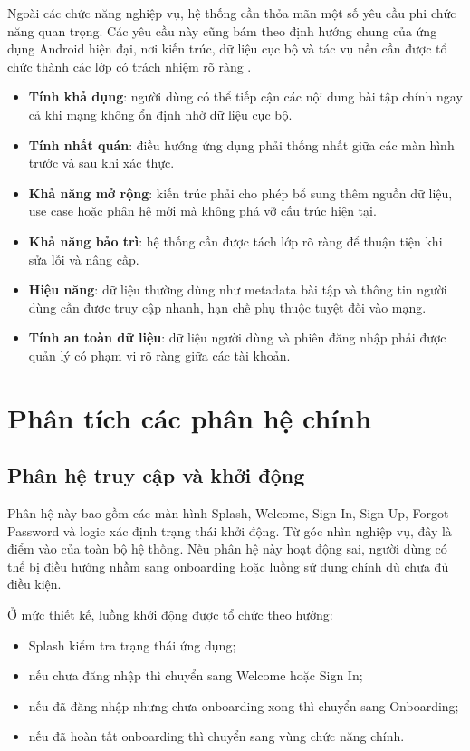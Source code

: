 Ngoài các chức năng nghiệp vụ, hệ thống cần thỏa mãn một số yêu cầu phi chức năng quan trọng. Các yêu cầu này cũng bám theo định hướng chung của ứng dụng Android hiện đại, nơi kiến trúc, dữ liệu cục bộ và tác vụ nền cần được tổ chức thành các lớp có trách nhiệm rõ ràng \cite{android_jetpack,android_room,android_workmanager}.

\begin{itemize}
    \item \textbf{Tính khả dụng}: người dùng có thể tiếp cận các nội dung bài tập chính ngay cả khi mạng không ổn định nhờ dữ liệu cục bộ.
    \item \textbf{Tính nhất quán}: điều hướng ứng dụng phải thống nhất giữa các màn hình trước và sau khi xác thực.
    \item \textbf{Khả năng mở rộng}: kiến trúc phải cho phép bổ sung thêm nguồn dữ liệu, use case hoặc phân hệ mới mà không phá vỡ cấu trúc hiện tại.
    \item \textbf{Khả năng bảo trì}: hệ thống cần được tách lớp rõ ràng để thuận tiện khi sửa lỗi và nâng cấp.
    \item \textbf{Hiệu năng}: dữ liệu thường dùng như metadata bài tập và thông tin người dùng cần được truy cập nhanh, hạn chế phụ thuộc tuyệt đối vào mạng.
    \item \textbf{Tính an toàn dữ liệu}: dữ liệu người dùng và phiên đăng nhập phải được quản lý có phạm vi rõ ràng giữa các tài khoản.
\end{itemize}

\section{Phân tích các phân hệ chính}

\subsection{Phân hệ truy cập và khởi động}

Phân hệ này bao gồm các màn hình Splash, Welcome, Sign In, Sign Up, Forgot Password và logic xác định trạng thái khởi động. Từ góc nhìn nghiệp vụ, đây là điểm vào của toàn bộ hệ thống. Nếu phân hệ này hoạt động sai, người dùng có thể bị điều hướng nhầm sang onboarding hoặc luồng sử dụng chính dù chưa đủ điều kiện.

Ở mức thiết kế, luồng khởi động được tổ chức theo hướng:

\begin{itemize}
    \item Splash kiểm tra trạng thái ứng dụng;
    \item nếu chưa đăng nhập thì chuyển sang Welcome hoặc Sign In;
    \item nếu đã đăng nhập nhưng chưa onboarding xong thì chuyển sang Onboarding;
    \item nếu đã hoàn tất onboarding thì chuyển sang vùng chức năng chính.
\end{itemize}

